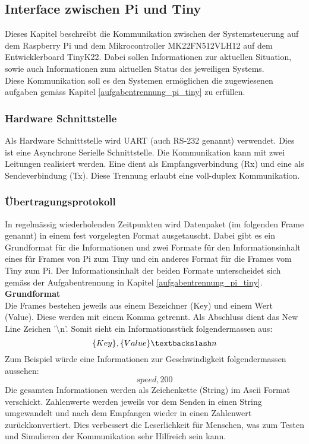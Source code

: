 \documentclass[../../main.tex]{subfiles}
\begin{document}
    \subsection{Interface zwischen Pi und Tiny} \label{interface_pi_tiny}
    Dieses Kapitel beschreibt die Kommunikation zwischen der Systemsteuerung auf dem Raspberry Pi und dem Mikrocontroller MK22FN512VLH12 auf dem Entwicklerboard TinyK22. Dabei sollen Informationen zur aktuellen Situation, sowie auch Informationen zum aktuellen Status des jeweiligen Systems.\\
    Diese Kommunikation soll es den Systemen ermöglichen die zugewiesenen aufgaben gemäss Kapitel \ref{aufgabentrennung_pi_tiny} zu erfüllen.

    \subsubsection{Hardware Schnittstelle}
    Als Hardware Schnittstelle wird UART (auch RS-232 genannt) verwendet. Dies ist eine Asynchrone Serielle Schnittstelle. Die Kommunikation kann mit zwei Leitungen realisiert werden. Eine dient als Empfangsverbindung (Rx) und eine als Sendeverbindung (Tx). Diese Trennung erlaubt eine voll-duplex Kommunikation.

    \subsubsection{Übertragungsprotokoll}
    In regelmässig wiederholenden Zeitpunkten wird Datenpaket (im folgenden Frame genannt) in einem fest vorgelegten Format ausgetauscht. Dabei gibt es ein Grundformat für die Informationen und zwei Formate für den Informationsinhalt eines für Frames von Pi zum Tiny und ein anderes Format für die Frames vom Tiny zum Pi. Der Informationsinhalt der beiden Formate unterscheidet sich gemäss der Aufgabentrennung in Kapitel \ref{aufgabentrennung_pi_tiny}.\\

    \textbf{Grundformat}\\
    Die Frames bestehen jeweils aus einem Bezeichner (Key) und einem Wert (Value). Diese werden mit einem Komma getrennt. Als Abschluss dient das New Line Zeichen '\textbackslash n'. Somit sieht ein Informationsstück folgendermassen aus: $$\{Key\},\{Value\}\textbackslash n$$
    Zum Beispiel würde eine Informationen zur Geschwindigkeit folgendermassen aussehen: $$speed,200$$
    Die gesamten Informationen werden als Zeichenkette (String) im Ascii Format verschickt. Zahlenwerte werden jeweils vor dem Senden in einen String umgewandelt und nach dem Empfangen wieder in einen Zahlenwert zurückkonvertiert. Dies verbessert die Leserlichkeit für Menschen, was zum Testen und Simulieren der Kommunikation sehr Hilfreich sein kann.
\end{document}
